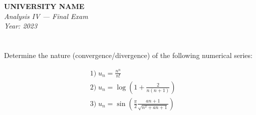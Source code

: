 \documentclass[12pt]{article}
\begin{document}
\begin{center}
  \Large\textbf{UNIVERSITY NAME} \\[1em]
  \large\textit{Analysis IV — Final Exam} \\[0.5em]
  \large\textit{Year: 2023} \\[2em]
\end{center}

\vspace{0.5cm}

\section{}
Determine the nature (convergence/divergence) of the following numerical series:

\[
\begin{aligned}
&1) \; u_n = \frac{n^n}{n!} \\
&2) \; u_n = \log\left(1 + \frac{2}{n(n+1)}\right) \\
&3) \; u_n = \sin \left(\frac{\pi}{2} \frac{a n + 1}{\sqrt{n^2 + a n + 1}}\right)
\end{aligned}
\]
\end{document}
